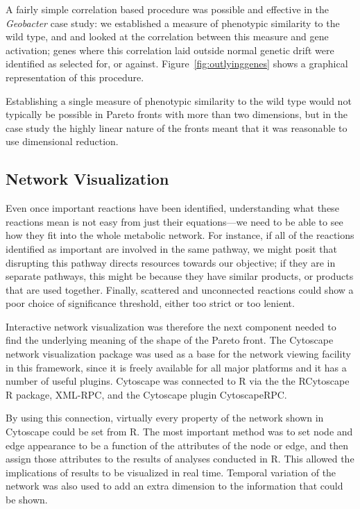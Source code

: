 \documentclass[a4paper,11pt]{article}
\begin{document}
A fairly simple correlation based procedure was possible and effective in the {\it Geobacter} case study: we established a measure of phenotypic similarity to the wild type, and and looked at the correlation between this measure and gene activation; genes where this correlation laid outside normal genetic drift were identified as selected for, or against. Figure~\ref{fig:outlyinggenes} shows a graphical representation of this procedure. 

Establishing a single measure of phenotypic similarity to the wild type would not typically be possible in Pareto fronts with more than two dimensions, but in the case study the highly linear nature of the fronts meant that it was reasonable to use dimensional reduction.

\subsection{Network Visualization}
Even once important reactions have been identified, understanding what these reactions mean is not easy from just their equations---we need to be able to see how they fit into the whole metabolic network. For instance, if all of the reactions identified as important are involved in the same pathway, we might posit that disrupting this pathway directs resources towards our objective; if they are in separate pathways, this might be because they have similar products, or products that are used together. Finally, scattered and unconnected reactions could show a poor choice of significance threshold, either too strict or too lenient.

Interactive network visualization was therefore the next component needed to find the underlying meaning of the shape of the Pareto front. 
The Cytoscape network visualization package was used as a base for the network viewing facility in this framework, since it is freely available for all major platforms and it has a number of useful plugins. Cytoscape was connected to R via the the RCytoscape R package, XML-RPC, and the Cytoscape plugin CytoscapeRPC.

By using this connection, virtually every property of the network shown in Cytoscape could be set from R. The most important method was to set node and edge appearance to be a function of the attributes of the node or edge, and then assign those attributes to the results of analyses conducted in R. This allowed the implications of results to be visualized in real time. Temporal variation of the network was also used to add an extra dimension to the information that could be shown.
\end{document}
